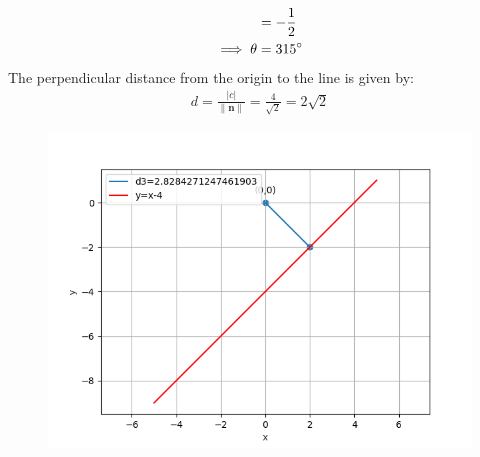\documentclass[12pt]{article}
\providecommand{\norm}[1]{\left\lVert#1\right\rVert}
\let\vec\mathbf
\begin{document}
\begin{enumerate}
\begin{align}
			&=-\frac{1}{2}\\
			\implies	\theta&=315\degree
                \end{align}                                                                           The perpendicular distance from the origin to the line is given by:                                          \begin{align}
			d=\frac{|c|}{\norm{\vec{n}}}=\frac{4}{\sqrt{2}}=2\sqrt{2}                    
                  \end{align}
\begin{figure}[H]
	\begin{center} 
	    \includegraphics[width=\columnwidth]{figs/line3.png}
	\end{center}
\caption{}
\label{fig:Fig3}
\end{figure}
\end{enumerate}
\end{document}
